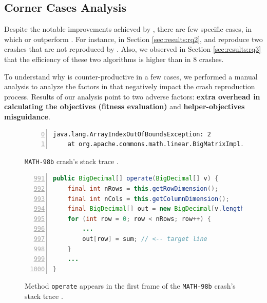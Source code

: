 \subsection{Corner Cases Analysis}
\label{sec:results:corner}

Despite the notable improvements achieved by \moho, there are few specific cases, in which \SGGA or \decomposition outperform \moho. For instance, in Section \ref{sec:results:rq2}, \SGGA and \decomposition reproduce two crashes that are not reproduced by \moho. Also, we observed in Section \ref{sec:results:rq3} that the efficiency of these two algorithms is higher than \moho in 8 crashes.

To understand why \moho is counter-productive in a few cases, we performed a manual analysis to analyze the factors in \moho that negatively impact the crash reproduction process. Results of our analysis point to two adverse factors: \textbf{extra overhead in calculating the objectives (fitness evaluation)} and \textbf{helper-objectives misguidance}.



\begin{figure}[t]
    \begin{lstlisting}[numbers=left,
        firstnumber=0]
java.lang.ArrayIndexOutOfBoundsException: 2
    at org.apache.commons.math.linear.BigMatrixImpl.operate(BigMatrixImpl.java:997)
    \end{lstlisting}
    \caption{\texttt{MATH-98b} crash's stack trace \cite{just2014defects4j}.}
    \label{lst:factor1-stacktrace}
\end{figure}


\begin{figure}[t]
    \begin{lstlisting}[numbers=left,
        firstnumber=991,
        language=Java,
        basicstyle=\footnotesize]
public BigDecimal[] operate(BigDecimal[] v) {
    final int nRows = this.getRowDimension();
    final int nCols = this.getColumnDimension();
    final BigDecimal[] out = new BigDecimal[v.length];
    for (int row = 0; row < nRows; row++) {
        ...
        out[row] = sum; // <-- target line 
    }
    ...
}
    \end{lstlisting}
    \caption{Method \texttt{operate} appears in the first frame of the \texttt{MATH-98b} crash's stack trace \cite{just2014defects4j}.}
    \label{lst:factor1-code}
\end{figure}


